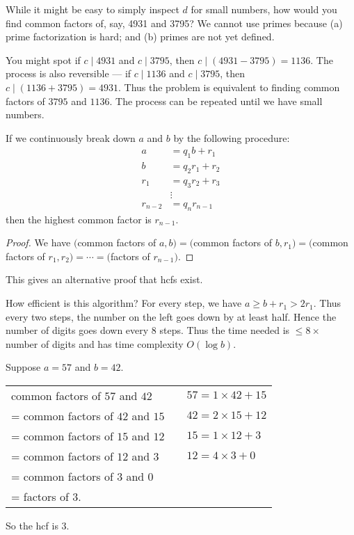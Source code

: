 \documentclass[a4paper]{article}
\begin{document}
While it might be easy to simply inspect $d$ for small numbers, how would you find common factors of, say, 4931 and 3795? We cannot use primes because (a) prime factorization is hard; and (b) primes are not yet defined.

You might spot if $c\mid 4931$ and $c\mid 3795$, then $c\mid (4931 - 3795)=1136$. The process is also reversible --- if $c\mid 1136$ and $c\mid 3795$, then $c\mid (1136 + 3795) = 4931$. Thus the problem is equivalent to finding common factors of $3795$ and $1136$. The process can be repeated until we have small numbers.

\begin{prop}
  If we continuously break down $a$ and $b$ by the following procedure:
  \begin{align*}
    a &= q_1b + r_1\\
    b &= q_2r_1 + r_2\\
    r_1 &= q_3r_2 + r_3\\
    &\vdots\\
    r_{n-2} &= q_nr_{n-1}
  \end{align*}
  then the highest common factor is $r_{n-1}$.
\end{prop}

\begin{proof}
  We have $($common factors of $a, b)=($common factors of $b, r_1)=($common factors of $r_1, r_2 )= \cdots = ($factors of $r_{n-1})$.
\end{proof}
This gives an alternative proof that hcfs exist.

How efficient is this algorithm? For every step, we have $a\geq b + r_1 > 2r_1$. Thus every two steps, the number on the left goes down by at least half. Hence the number of digits goes down every 8 steps. Thus the time needed is $\leq 8\times$ number of digits and has time complexity $O(\log b)$.

\begin{eg}
  Suppose $a = 57$ and $b = 42$.
  \begin{center}
    \begin{tabular}{l l l}
      common factors of $57$ and $42$ & & $57 = 1\times 42 + 15$ \\
      = common factors of $42$ and $15$ & & $42 = 2\times 15 + 12$ \\
      = common factors of $15$ and $12$ & & $15 = 1\times 12 + 3$ \\
      = common factors of $12$ and $3$ & & $12 = 4\times 3 + 0$ \\
      = common factors of $3$ and $0$ \\
      = factors of $3$.
    \end{tabular}
  \end{center}
  So the hcf is $3$.
\end{eg}
\end{document}
